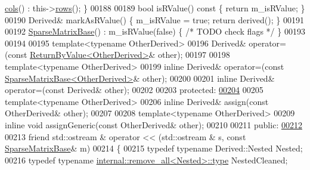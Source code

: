 \begin{DoxyCode}
      \hyperlink{group___sparse_core___module_aca7ce296424ef6e478ab0fb19547a7ee}{cols}() : this->\hyperlink{group___sparse_core___module_a1944e9fa9ce7937bfc3a87b2cb94371f}{rows}(); \}
00188 
00189     \textcolor{keywordtype}{bool} isRValue()\textcolor{keyword}{ const }\{ \textcolor{keywordflow}{return} m\_isRValue; \}
00190     Derived& markAsRValue() \{ m\_isRValue = \textcolor{keyword}{true}; \textcolor{keywordflow}{return} derived(); \}
00191 
00192     \hyperlink{group___sparse_core___module_class_eigen_1_1_sparse_matrix_base}{SparseMatrixBase}() : m\_isRValue(\textcolor{keyword}{false}) \{ \textcolor{comment}{/* TODO check flags */} \}
00193 
00194     
00195     \textcolor{keyword}{template}<\textcolor{keyword}{typename} OtherDerived>
00196     Derived& operator=(\textcolor{keyword}{const} \hyperlink{group___core___module_class_eigen_1_1_return_by_value}{ReturnByValue<OtherDerived>}& other);
00197 
00198     \textcolor{keyword}{template}<\textcolor{keyword}{typename} OtherDerived>
00199     \textcolor{keyword}{inline} Derived& operator=(\textcolor{keyword}{const} \hyperlink{group___sparse_core___module_class_eigen_1_1_sparse_matrix_base}{SparseMatrixBase<OtherDerived>}& other);
00200 
00201     \textcolor{keyword}{inline} Derived& operator=(\textcolor{keyword}{const} Derived& other);
00202 
00203   \textcolor{keyword}{protected}:
\hyperlink{group___sparse_core___module_a15819a901d677053cff381a3b7c6739b}{00204} 
00205     \textcolor{keyword}{template}<\textcolor{keyword}{typename} OtherDerived>
00206     \textcolor{keyword}{inline} Derived& assign(\textcolor{keyword}{const} OtherDerived& other);
00207 
00208     \textcolor{keyword}{template}<\textcolor{keyword}{typename} OtherDerived>
00209     \textcolor{keyword}{inline} \textcolor{keywordtype}{void} assignGeneric(\textcolor{keyword}{const} OtherDerived& other);
00210 
00211   \textcolor{keyword}{public}:
\hyperlink{group___sparse_core___module_a61a62a5375ec7c8d1584b880aaa9428d}{00212} 
00213     \textcolor{keyword}{friend} std::ostream & operator << (std::ostream & s, \textcolor{keyword}{const} \hyperlink{group___sparse_core___module_class_eigen_1_1_sparse_matrix_base}{SparseMatrixBase}& m)
00214     \{
00215       \textcolor{keyword}{typedef} \textcolor{keyword}{typename} Derived::Nested Nested;
00216       \textcolor{keyword}{typedef} \textcolor{keyword}{typename} \hyperlink{group___sparse_core___module}{internal::remove\_all<Nested>::type} NestedCleaned;

\end{DoxyCode}
